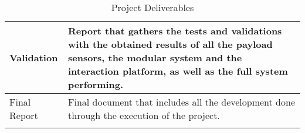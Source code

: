 \begin{longtable}[H]{>{\raggedright\arraybackslash}p{4cm} p{10cm}}
	Validation & 
	Report that gathers the tests and validations with the obtained results of all the payload sensors, the modular system and the interaction platform, as well as the full system performing. 
	\vspace{0.2cm}
	\\ \midrule
		
	Final Report & 
	Final document that includes all the development done through the execution of the project. 
	\vspace{0.2cm}

	\\ \bottomrule[2pt]
	
	\caption{Project Deliverables}
	\label{PDel}

\end{longtable}